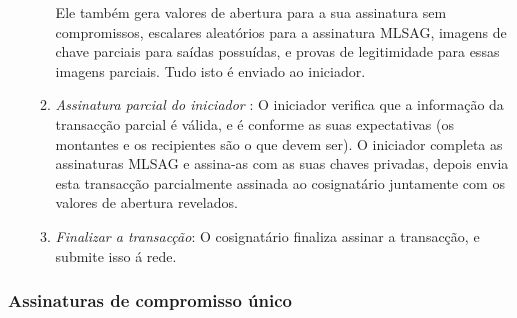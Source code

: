 \begin{enumerate}
\begin{enumerate}
Ele também gera valores de abertura para a sua assinatura sem compromissos, escalares aleatórios para a assinatura MLSAG, imagens de chave parciais para saídas possuídas, e provas de legitimidade para essas imagens parciais. Tudo isto é enviado ao iniciador.  
        \item {\em Assinatura parcial do iniciador} : O iniciador verifica que a informação da transacção parcial é válida, e é conforme as suas expectativas (os montantes e os recipientes são o que devem ser). O iniciador completa as assinaturas MLSAG e assina-as com as suas chaves privadas, depois envia esta transacção parcialmente assinada ao cosignatário juntamente com os valores de abertura revelados. 
        \item {\em Finalizar a transacção}: O cosignatário finaliza assinar a transacção, e submite isso á rede.
    \end{enumerate}{}
\end{enumerate}{}

\subsubsection*{Assinaturas de compromisso único}


